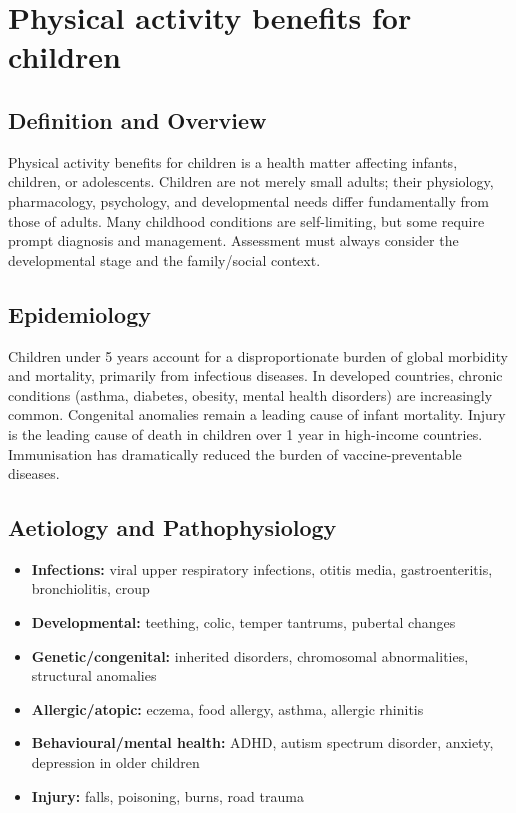 \chapter{Physical activity benefits for children}

\section*{Definition and Overview}
Physical activity benefits for children is a health matter affecting infants, children, or adolescents. Children are not merely small adults; their physiology, pharmacology, psychology, and developmental needs differ fundamentally from those of adults. Many childhood conditions are self-limiting, but some require prompt diagnosis and management. Assessment must always consider the developmental stage and the family/social context.

\section*{Epidemiology}
Children under 5 years account for a disproportionate burden of global morbidity and mortality, primarily from infectious diseases. In developed countries, chronic conditions (asthma, diabetes, obesity, mental health disorders) are increasingly common. Congenital anomalies remain a leading cause of infant mortality. Injury is the leading cause of death in children over 1 year in high-income countries. Immunisation has dramatically reduced the burden of vaccine-preventable diseases.

\section*{Aetiology and Pathophysiology}
\begin{itemize}
    \item \textbf{Infections:} viral upper respiratory infections, otitis media, gastroenteritis, bronchiolitis, croup
    \item \textbf{Developmental:} teething, colic, temper tantrums, pubertal changes
    \item \textbf{Genetic/congenital:} inherited disorders, chromosomal abnormalities, structural anomalies
    \item \textbf{Allergic/atopic:} eczema, food allergy, asthma, allergic rhinitis
    \item \textbf{Behavioural/mental health:} ADHD, autism spectrum disorder, anxiety, depression in older children
    \item \textbf{Injury:} falls, poisoning, burns, road trauma
\end{itemize}

